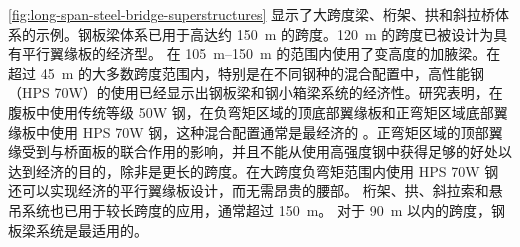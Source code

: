 \cref{fig:long-span-steel-bridge-superstructures} 显示了大跨度梁、桁架、拱和斜拉桥体系的示例。钢板梁体系已用于高达约 \qty{150}{m} 的跨度。\qty{120}{m} 的跨度已被设计为具有平行翼缘板的经济型。 在 \qtyrange{105}{150}{m} 的范围内使用了变高度的加腋梁。在超过 \qty{45}{m} 的大多数跨度范围内，特别是在不同钢种的混合配置中，高性能钢（HPS 70W）的使用已经显示出钢板梁和钢小箱梁系统的经济性。研究表明，在腹板中使用传统等级 50W 钢，在负弯矩区域的顶底部翼缘板和正弯矩区域底部翼缘板中使用 HPS 70W 钢，这种混合配置通常是最经济的 \cite{horton2003h}。正弯矩区域的顶部翼缘受到与桥面板的联合作用的影响，并且不能从使用高强度钢中获得足够的好处以达到经济的目的，除非是更长的跨度。在大跨度负弯矩范围内使用 HPS 70W 钢还可以实现经济的平行翼缘板设计，而无需昂贵的腰部。 桁架、拱、斜拉索和悬吊系统也已用于较长跨度的应用，通常超过 \qty{150}{m}。 对于 \qty{90}{m} 以内的跨度，钢板梁系统是最适用的。

